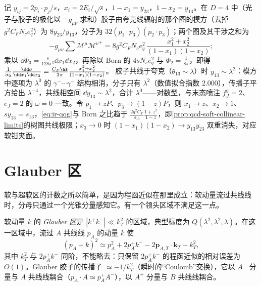 \begin{example}\label{ex:ir-real-emission}
记 $y_{ij}=2p_i\cdot p_j/s$，$x_i=2E_i/\sqrt s$，$1-x_1=y_{23}$，$1-x_2=y_{13}$。在 $D=4$ 中（光子与胶子的极化以 $-g_{\mu\nu}$ 求和）胶子由夸克线辐射的那个图的模方（去掉 $g^2C_FN_ce_q^2$）为 $8y_{23}/y_{13}$，分子为 $32(p_1\cdot p_3)(p_2\cdot p_3)$；两个图及其干涉之和为
\begin{equation}\label{eq:ir-qqg}
-g_{\mu\nu}\sum\mathcal M^\mu\mathcal M^{\nu*}=8g^2C_FN_ce_q^2\,\frac{x_1^2+x_2^2}{(1-x_1)(1-x_2)} ;
\end{equation}
乘以 $\dd\Phi_3=\frac{s}{128\pi^3}\dd x_1\dd x_2$，再除以 Born 的 $4sN_ce_q^2$ 与 $\Phi_2=\frac1{8\pi}$，即得 $\frac1{\sigma_0}\frac{\dd\sigma}{\dd x_1\dd x_2}=\frac{C_F\as}{2\pi}\frac{x_1^2+x_2^2}{(1-x_1)(1-x_2)}$。%
胶子共线于夸克（$\theta_{13}\sim\lambda$）时 $y_{13}\sim\lambda^2$：模方中逐项为 $\lambda^0$ 的 $\gamma^-\cdots\gamma^-$ 结构相消，分子只有 $\lambda^2$（数值拟合指数 $2.000$），传播子平方给出 $\lambda^{-4}$，共线相空间 $\dd y_{13}\sim\lambda^2$，合计 $\lambda^0$——对数型，与末态喷注 $f^g_J=2$、$e_J=2$ 的 $\omega=0$ 一致。令 $p_1\to zP$、$p_3\to(1-z)P$，则 $x_1\to z$、$x_2\to1$、$sy_{13}=s_{13}$，\cref{eq:ir-qqg}与 Born 之比趋于 $\frac{2g^2C_F}{s_{13}}\frac{1+z^2}{1-z}$，即\cref{prop:qcd-soft-collinear-limits}的树图共线极限；$x_3\to0$ 时 $(1-x_1)(1-x_2)\to y_{13}y_{23}$ 双重消失，对应软钳夹面。
\end{example}
\section{Glauber 区}\label{sec:ir-glauber}

软与超软区的计数之所以简单，是因为程函近似在那里成立：软动量流过共线线时，分母只通过一个光锥分量感知它。有一个领头区域不满足这一点。

\begin{definition}[Glauber 区]\label{def:ir-glauber}
软动量 $k$ 的 \emph{Glauber 区}是 $|k^+k^-|\ll k_T^2$ 的区域，典型标度为 $Q(\lambda^2,\lambda^2,\lambda)$。在这一区域中，流过 $A$ 共线线 $p_A$ 的动量 $k$ 使
\begin{equation}\label{eq:ir-glauber-denom}
(p_A+k)^2\simeq p_A^2+2p_A^+k^--2\mathbf p_{A,T}\cdot\mathbf k_T-k_T^2 ,
\end{equation}
其中 $k_T^2$ 与 $2p_A^+k^-$ 同阶，不能略去：只保留 $2p_A^+k^-$ 的程函近似的相对误差为 $O(1)$。Glauber 胶子的传播子 $\simeq-1/k_T^2$（瞬时的“Coulomb”交换），它以 $A^-$ 分量与 $A$ 共线线耦合（$p_A\cdot A\simeq p_A^+A^-$），以 $A^+$ 分量与 $B$ 共线线耦合。
\end{definition}

